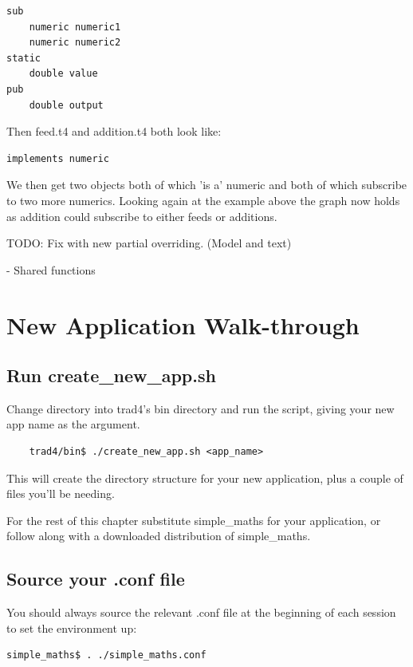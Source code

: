 \documentclass{report}
\begin{document}
\begin{verbatim}
sub
    numeric numeric1
    numeric numeric2
static
    double value
pub
    double output
\end{verbatim}

Then feed.t4 and addition.t4 both look like:

\begin{verbatim}
implements numeric
\end{verbatim}

We then get two objects both of which 'is a' numeric and both of which subscribe to two more numerics. Looking again at the example above the graph now holds as addition could subscribe to either feeds or additions.

TODO: Fix with new partial overriding. (Model and text)

- Shared functions


\chapter{New Application Walk-through}

\section{Run create_new_app.sh}

Change directory into trad4's bin directory and run the script, giving your new app name as the argument.

\begin{verbatim}
    trad4/bin$ ./create_new_app.sh <app_name>
\end{verbatim}

This will create the directory structure for your new application, plus a couple of files you'll be needing.

For the rest of this chapter substitute simple_maths for your application, or follow along with a downloaded  distribution of simple_maths.

\section{Source your .conf file}

You should always source the relevant .conf file at the beginning of each session to set the environment  up:

\begin{verbatim}
simple_maths$ . ./simple_maths.conf
\end{verbatim}
\end{document}
